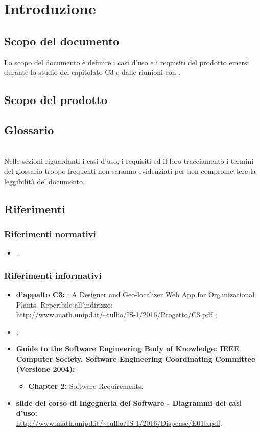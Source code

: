 \section{Introduzione}
	\subsection {Scopo del documento}
	Lo scopo del documento è definire i casi d'uso e i requisiti del prodotto emersi durante lo studio del capitolato C3 e dalle riunioni con \riskapp.
	\subsection {Scopo del prodotto}
	\introScopo
	\subsection {Glossario}
	\introGlossario\\
    Nelle sezioni riguardanti i casi d'uso, i requisiti ed il loro tracciamento i termini del glossario troppo frequenti non saranno evidenziati per non compromettere la leggibilità del documento.
	\subsection {Riferimenti}
		\subsubsection{Riferimenti normativi}
			\begin{itemize}
				\item \ndpv.
			\end{itemize}
		\subsubsection{Riferimenti informativi}
			\begin{itemize}
				\item \textbf{ d'appalto C3:} \progetto: A Designer and Geo-localizer Web App for Organizational Plants. Reperibile all'indirizzo:\\ \url{http://www.math.unipd.it/~tullio/IS-1/2016/Progetto/C3.pdf} ;
				\item \sdfv;
				\item \textbf{Guide to the Software Engineering Body of Knowledge: IEEE Computer Society. Software Engineering Coordinating Committee (Versione 2004):}
				\begin{itemize}
					\item \textbf{Chapter 2:} Software Requirements.
				\end{itemize}
				\item \textbf{slide del corso di Ingegneria del Software - Diagrammi dei casi d'uso:}\\
				\url{http://www.math.unipd.it/~tullio/IS-1/2016/Dispense/E01b.pdf}.
			\end{itemize}
